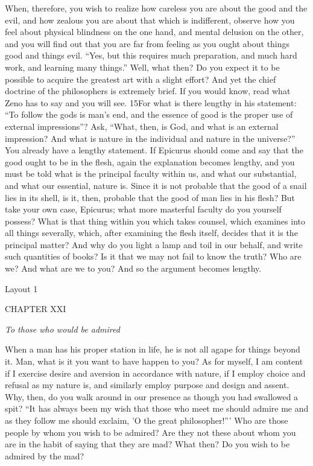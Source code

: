 When, therefore, you wish to realize how careless you are about the good and the evil, and how zealous you are about that which is indifferent, observe how you feel about physical blindness on the one hand, and mental delusion on the other, and you will find out that you are far from feeling as you ought about things good and things evil. ``Yes, but this requires much preparation, and much hard work, and learning many things.'' Well, what then? Do you expect it to be possible to acquire the greatest art with a slight effort? And yet the chief doctrine of the philosophers is extremely brief. If you would know, read what Zeno has to say and you will see. 15For what is there lengthy in his statement: ``To follow the gods is man's end, and the essence of good is the proper use of external impressions''? Ask, ``What, then, is God, and what is an external impression? And what is nature in the individual and nature in the universe?'' You already have a lengthy statement. If Epicurus should come and say that the good ought to be in the flesh, again the explanation becomes lengthy, and you must be told what is the principal faculty within us, and what our substantial, and what our essential, nature is. Since it is not probable that the good of a snail lies in its shell, is it, then, probable that the good of man lies in his flesh? But take your own case, Epicurus; what more masterful faculty do you yourself possess? What is that thing within you which takes counsel, which examines into all things severally, which, after examining the flesh itself, decides that it is the principal matter? And why do you light a lamp and toil in our behalf, and write such quantities of books? Is it that we may not fail to know the truth? Who are we? And what are we to you? And so the argument becomes lengthy.



Layout 1

CHAPTER XXI

\emph{To those who would be admired}

When a man has his proper station in life, he is not all agape for things beyond it. Man, what is it you want to have happen to you? As for myself, I am content if I exercise desire and aversion in accordance with nature, if I employ choice and refusal as my nature is, and similarly employ purpose and design and assent. Why, then, do you walk around in our presence as though you had swallowed a spit? ``It has always been my wish that those who meet me should admire me and as they follow me should exclaim, 'O the great philosopher!''' Who are those people by whom you wish to be admired? Are they not these about whom you are in the habit of saying that they are mad? What then? Do you wish to be admired by the mad?

